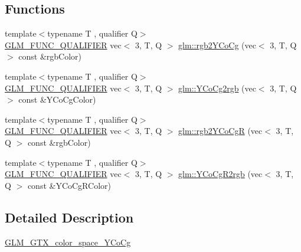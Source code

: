 \subsection*{Functions}
\begin{DoxyCompactItemize}
\item 
{\footnotesize template$<$typename T , qualifier Q$>$ }\\\hyperlink{setup_8hpp_a33fdea6f91c5f834105f7415e2a64407}{G\+L\+M\+\_\+\+F\+U\+N\+C\+\_\+\+Q\+U\+A\+L\+I\+F\+I\+ER} vec$<$ 3, T, Q $>$ \hyperlink{group__gtx__color__space___y_co_cg_ga0606353ec2a9b9eaa84f1b02ec391bc5}{glm\+::rgb2\+Y\+Co\+Cg} (vec$<$ 3, T, Q $>$ const \&rgb\+Color)
\item 
{\footnotesize template$<$typename T , qualifier Q$>$ }\\\hyperlink{setup_8hpp_a33fdea6f91c5f834105f7415e2a64407}{G\+L\+M\+\_\+\+F\+U\+N\+C\+\_\+\+Q\+U\+A\+L\+I\+F\+I\+ER} vec$<$ 3, T, Q $>$ \hyperlink{group__gtx__color__space___y_co_cg_ga163596b804c7241810b2534a99eb1343}{glm\+::\+Y\+Co\+Cg2rgb} (vec$<$ 3, T, Q $>$ const \&Y\+Co\+Cg\+Color)
\item 
{\footnotesize template$<$typename T , qualifier Q$>$ }\\\hyperlink{setup_8hpp_a33fdea6f91c5f834105f7415e2a64407}{G\+L\+M\+\_\+\+F\+U\+N\+C\+\_\+\+Q\+U\+A\+L\+I\+F\+I\+ER} vec$<$ 3, T, Q $>$ \hyperlink{group__gtx__color__space___y_co_cg_ga0389772e44ca0fd2ba4a79bdd8efe898}{glm\+::rgb2\+Y\+Co\+CgR} (vec$<$ 3, T, Q $>$ const \&rgb\+Color)
\item 
{\footnotesize template$<$typename T , qualifier Q$>$ }\\\hyperlink{setup_8hpp_a33fdea6f91c5f834105f7415e2a64407}{G\+L\+M\+\_\+\+F\+U\+N\+C\+\_\+\+Q\+U\+A\+L\+I\+F\+I\+ER} vec$<$ 3, T, Q $>$ \hyperlink{group__gtx__color__space___y_co_cg_gaf8d30574c8576838097d8e20c295384a}{glm\+::\+Y\+Co\+Cg\+R2rgb} (vec$<$ 3, T, Q $>$ const \&Y\+Co\+Cg\+R\+Color)
\end{DoxyCompactItemize}


\subsection{Detailed Description}
\hyperlink{group__gtx__color__space___y_co_cg}{G\+L\+M\+\_\+\+G\+T\+X\+\_\+color\+\_\+space\+\_\+\+Y\+Co\+Cg} 